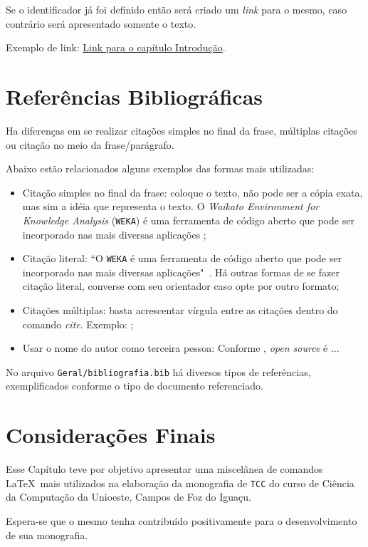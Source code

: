 Se o identificador já foi definido então será criado um \textit{link} para o mesmo, caso contrário será apresentado somente o texto. 

Exemplo de link: \hyperref[cap:introducao]{Link para o capítulo Introdução}. 

\section {Referências Bibliográficas} 

Ha diferenças em se realizar citações simples no final da frase, múltiplas citações ou citação no meio da frase/parágrafo. 

Abaixo estão relacionados alguns exemplos das formas mais utilizadas:
\begin{itemize}
    \item Citação simples no final da frase: coloque o texto, não pode ser a cópia exata, mas sim a idéia que representa o texto. O \textit{Waikato Environment for Knowledge Analysis} (\verb'WEKA') 
     é uma ferramenta de código aberto que pode ser incorporado nas mais diversas aplicações \cite{Weka2014};
    
    \item Citação literal: ``O \verb'WEKA' é uma ferramenta de código aberto que pode ser incorporado nas mais diversas aplicações"~\cite{Weka2014}. Há outras formas de se fazer citação literal, converse com seu orientador caso opte por outro formato;
    
    \item Citações múltiplas: basta acrescentar vírgula entre as citações dentro do comando \textit{cite}. Exemplo: \cite{Weka2014,Scipy2013};
    
    \item Usar o nome do autor como terceira pessoa: Conforme , \textit{open source} é ...
    
\end{itemize}


No arquivo \verb'Geral/bibliografia.bib' há diversos tipos de referências, exemplificados conforme o tipo de documento referenciado.




\section {Considerações Finais}

Esse Capítulo teve por objetivo apresentar uma miscelânea de comandos \LaTeX\ mais utilizados na elaboração da monografia de \verb'TCC' do curso de Ciência da Computação da Unioeste, Campos de Foz do Iguaçu. 

Espera-se que o mesmo tenha contribuído positivamente para o desenvolvimento de sua monografia.

